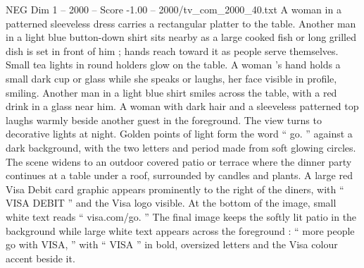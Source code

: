 \begin{textsample}{NEG Dim 1 – 2000 – Score -1.00 – 2000/tv\_com\_2000\_40.txt}
A woman in a patterned sleeveless dress carries a rectangular platter to the table.
Another man in a light blue button-down shirt sits nearby as a large cooked fish or long grilled dish is set in front of him ; hands reach toward it as people serve themselves.
Small tea lights in round holders glow on the table.
A woman ’s hand holds a small dark cup or glass while she speaks or laughs, her face visible in profile, smiling.
Another man in a light blue shirt smiles across the table, with a red drink in a glass near him.
A woman with dark hair and a sleeveless patterned top laughs warmly beside another guest in the foreground.
The view turns to decorative lights at night.
Golden points of light form the word “ go. ” against a dark background, with the two letters and period made from soft glowing circles.
The scene widens to an outdoor covered patio or terrace where the dinner party continues at a table under a roof, surrounded by candles and plants.
A large red Visa Debit card graphic appears prominently to the right of the diners, with “ VISA DEBIT ” and the Visa logo visible.
At the bottom of the image, small white text reads “ visa.com/go. ” The final image keeps the softly lit patio in the background while large white text appears across the foreground : “ more people go with VISA, ” with “ VISA ” in bold, oversized letters and the Visa colour accent beside it.

\end{textsample}
